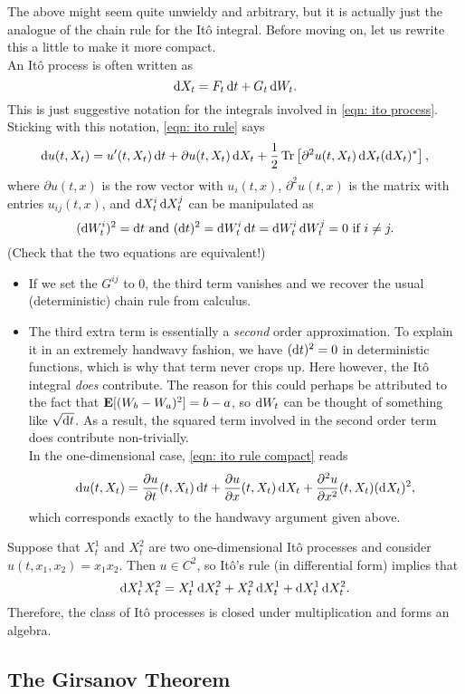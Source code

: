 The above might seem quite unwieldy and arbitrary, but it is actually just the analogue of the chain rule for the It\^{o} integral. Before moving on, let us rewrite this a little to make it more compact.\\
An It\^{o} process is often written as
\[ \operatorname{d}\!{X}_t = F_t \operatorname{d}\!{t} + G_t\operatorname{d}\!{W}_t. \]
This is just suggestive notation for the integrals involved in \eqref{eqn: ito process}. Sticking with this notation, \eqref{eqn: ito rule} says
\begin{equation}
	\label{eqn: ito rule compact}
	\operatorname{d}\!{u}(t,X_t) = u'(t,X_t)\operatorname{d}\!{t} + \partial u(t,X_t)\operatorname{d}\!{X}_t + \frac{1}{2} \operatorname{Tr}\left[\partial^2 u(t,X_t) \operatorname{d}\!{X}_t(\operatorname{d}\!{X}_t)^*\right],
\end{equation}
where $\partial u(t,x)$ is the row vector with $u_i(t,x)$, $\partial^2 u(t,x)$ is the matrix with entries $u_{ij}(t,x)$, and $\operatorname{d}\!{X}^i_t\operatorname{d}\!{X}^j_t$ can be manipulated as
\[ (\operatorname{d}\!{W}^i_t)^2 = \operatorname{d}\!{t} \text{ and } (\operatorname{d}\!{t})^2 = \operatorname{d}\!{W}^i_t\operatorname{d}\!{t} = \operatorname{d}\!{W}^i_t\operatorname{d}\!{W}^j_t = 0 \text{ if } i\neq j. \]
(Check that the two equations are equivalent!)
\begin{itemize}
	\item If we set the $G^{ij}$ to $0$, the third term vanishes and we recover the usual (deterministic) chain rule from calculus.
	\item The third extra term is essentially a \textit{second} order approximation. To explain it in an extremely handwavy fashion, we have $(\operatorname{d}\!{t})^2 = 0$ in deterministic functions, which is why that term never crops up. Here however, the It\^{o} integral \textit{does} contribute. The reason for this could perhaps be attributed to the fact that $\textbf{E}[(W_b-W_a)^2] = b-a$, so $\operatorname{d}\!{W}_t$ can be thought of something like $\sqrt{\operatorname{d}\!{t}}$. As a result, the squared term involved in the second order term does contribute non-trivially.\\
	In the one-dimensional case, \eqref{eqn: ito rule compact} reads
	\[ \operatorname{d}\!{u}(t,X_t) = \frac{\partial u}{\partial t} (t,X_t)\operatorname{d}\!{t} + \frac{\partial u}{\partial x} (t,X_t)\operatorname{d}\!{X_t} + \frac{\partial^2 u}{\partial x^2}(t,X_t) (\operatorname{d}\!{X}_t)^2, \]
	which corresponds exactly to the handwavy argument given above.
\end{itemize}

Suppose that $X^1_t$ and $X^2_t$ are two one-dimensional It\^{o} processes and consider $u(t,x_1,x_2)=x_1x_2$. Then $u\in C^2$, so It\^{o}'s rule (in differential form) implies that
\[ \operatorname{d}\!{X_t^1 X_t^2} = X_t^1 \operatorname{d}\!{X}_t^2 + X_t^2 \operatorname{d}\!{X}_t^1 + \operatorname{d}\!{X}_t^1\operatorname{d}\!{X}_t^2. \]
Therefore, the class of It\^{o} processes is closed under multiplication and forms an algebra.

\subsection{The Girsanov Theorem}

